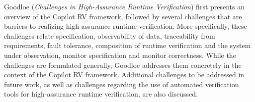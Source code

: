 

Goodloe
\cite{isola-2016-goodloe}
({\em Challenges in High-Assurance Runtime Verification}) 
first presents an overview of the Copilot RV framework, followed by
several challenges that are barriers to realizing
high-assurance runtime verification. More specifically, these
challenges relate
specification, observability of data, traceability from requirements,
fault tolerance, composition of runtime verification and the system under observation,
monitor specification and monitor correctness. 
While the challenges are formulated generally, Goodloe addresses them
concretely in the context of the Copilot RV framework.
Additional challenges to be addressed in future work, as well as challenges regarding the use of automated verification tools for high-assurance runtime verification, are also discussed. 

